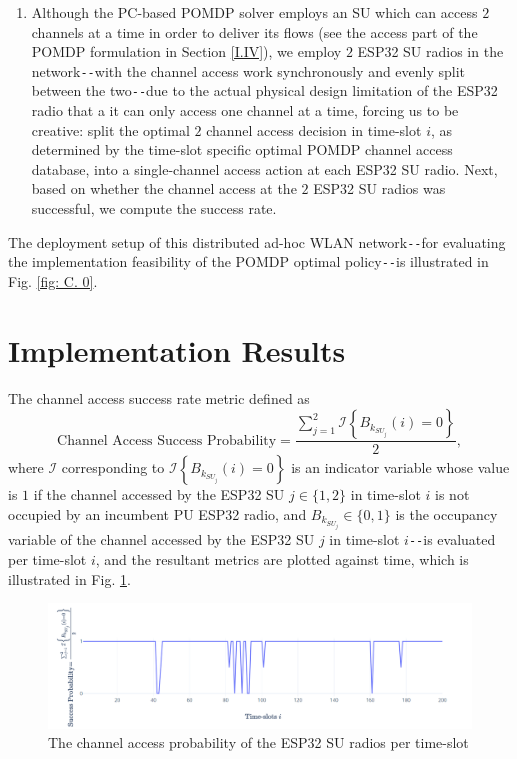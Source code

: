 \documentclass[12pt, draftcls, onecolumn]{IEEEtran}
\begin{document}
\begin{enumerate}
    \item Although the PC-based POMDP solver employs an SU which can access $2$ channels at a time in order to deliver its flows (see the access part of the POMDP formulation in Section \ref{I.IV}), we employ $2$ ESP32 SU radios in the network\texttt{-{}-}with the channel access work synchronously and evenly split between the two\texttt{-{}-}due to the actual physical design limitation of the ESP32 radio that a it can only access one channel at a time, forcing us to be creative: split the optimal $2$ channel access decision in time-slot $i$, as determined by the time-slot specific optimal POMDP channel access database, into a single-channel access action at each ESP32 SU radio. Next, based on whether the channel access at the $2$ ESP32 SU radios was successful, we compute the success rate.
\end{enumerate}
The deployment setup of this distributed ad-hoc WLAN network\texttt{-{}-}for evaluating the implementation feasibility of the POMDP optimal policy\texttt{-{}-}is illustrated in Fig. \ref{fig: C. 0}.
\section{Implementation Results}\label{D.I}
The channel access success rate metric defined as
\begin{equation}\label{C.I}
    \text{Channel Access Success Probability}=\frac{\sum_{j=1}^{2}\mathcal{I}\left\{B_{k_{SU_{j}}}(i)=0\right\}}{2},
\end{equation}
where $\mathcal{I}$ corresponding to $\mathcal{I}\left\{B_{k_{SU_{j}}}(i)=0\right\}$ is an indicator variable whose value is $1$ if the channel accessed by the ESP32 SU $j{\in}\{1,2\}$ in time-slot $i$ is not occupied by an incumbent PU ESP32 radio, and $B_{k_{SU_{j}}}{\in}\{0,1\}$ is the occupancy variable of the channel accessed by the ESP32 SU $j$ in time-slot $i$\texttt{-{}-}is evaluated per time-slot $i$, and the resultant metrics are plotted against time, which is illustrated in Fig. \ref{fig:C.1}.
\begin{figure} [htb]
    \centerline{
    \includegraphics[width = 1.0\textwidth]{ESP32_Success_Probability.PNG}}
    \caption{The channel access probability of the ESP32 SU radios per time-slot}
    \label{fig:C.1}
\end{figure}
\end{document}
